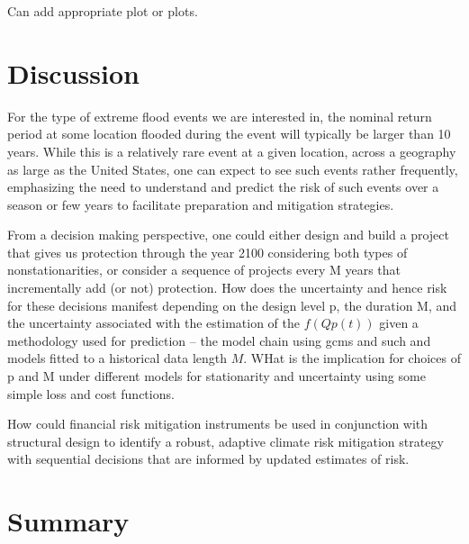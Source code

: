 \documentclass[12pt]{article}
\begin{document}
Can add appropriate plot or plots.

\section{Discussion}

For the type of extreme flood events we are interested in, the nominal return period at some location flooded during the event will typically be larger than 10 years.
While this is a relatively rare event at a given location, across a geography as large as the United States, one can expect to see such events rather frequently, emphasizing the need to understand and predict the risk of such events over a season or few years to facilitate preparation and mitigation strategies.

From a decision making perspective, one could either design and build a project that gives us protection through the year 2100 considering both types of nonstationarities, or consider a sequence of projects every M years that incrementally add (or not) protection. How does the uncertainty and hence risk for these decisions manifest depending on the design level p, the duration M, and the uncertainty associated with the estimation of the \( f(Qp(t)) \) given a methodology used for prediction -- \eg{} the model chain using gcms and such and models fitted to a historical data length \(M\).
WHat is the implication for choices of p and M under different models for stationarity and uncertainty using some simple loss and cost  functions.

How could  financial risk mitigation instruments be used in conjunction with structural design to identify a robust, adaptive climate risk mitigation strategy with sequential decisions that are informed by updated estimates of risk.


\section{Summary}
\end{document}
